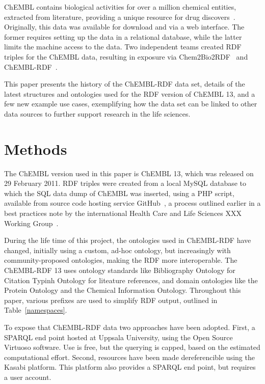 \documentclass[sw]{iosart2c}
\begin{document}
ChEMBL contains biological activities for over a million chemical entities, extracted from
literature, providing a unique resource for drug discovers~\cite{Warr2010}. Originally, this
data was available for download and via a web interface. The former requires setting up
the data in a relational database, while the latter limits the machine access to the data.
Two independent teams created RDF triples for the ChEMBL data, resulting in exposure
via Chem2Bio2RDF~\cite{} and ChEMBL-RDF~\cite{Willighagen2011}.

This paper presents the history of the ChEMBL-RDF data set, details of the latest structures
and ontologies used for the RDF version of ChEMBL 13, and a few new example use cases,
exemplifying how the data set can be linked to other data sources to further support
research in the life sciences.

\section{Methods}\label{s2}

The ChEMBL version used in this paper is ChEMBL 13, which was released on 29 February 2011.
RDF triples were created from a local MySQL database to which the SQL data dump of ChEMBL was
inserted, using a PHP script, available from source code hosting service
GitHub~\citep{ChEMBLRDFGitHub}, a process outlined earlier in a best practices note by
the international Health Care and Life Sciences XXX Working Group~\cite{Marshall2012}.

During the life time of this project, the ontologies used in ChEMBL-RDF have changed,
initially using a custom, ad-hoc ontology, but increasingly with community-proposed
ontologies, making the RDF more interoperable. The ChEMBL-RDF 13 uses ontology
standards like Bibliography Ontology for Citation Typinh Ontology for liteature
references, and domain ontologies like the Protein Ontology and the Chemical Information
Ontology. Throughout this paper, various prefixes are used to simplify RDF output, outlined
in Table~\ref{namespaces}.

To expose that ChEMBL-RDF data two approaches have been adopted. First, a SPARQL end point
hosted at Uppsala University, using the Open Source Virtuoso software. Use is free, but the
querying is capped, based on the estimated computational effort. Second, resources have
been made dereferencible using the Kasabi platform. This platform also provides a SPARQL
end point, but requires a user account.
\end{document}
